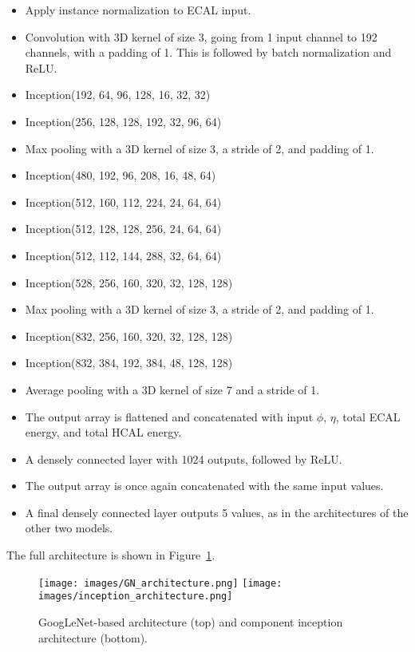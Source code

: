 \begin{itemize}
    \item Apply instance normalization to ECAL input.
    \item Convolution with 3D kernel of size 3, going from 1 input channel to 192 channels, with a padding of 1. This is followed by batch normalization and ReLU.
    \item Inception(192,  64,  96, 128, 16, 32, 32)
    \item Inception(256, 128, 128, 192, 32, 96, 64)
    \item Max pooling with a 3D kernel of size 3, a stride of 2, and padding of 1.
    \item Inception(480, 192,  96, 208, 16,  48,  64)
    \item Inception(512, 160, 112, 224, 24,  64,  64)
    \item Inception(512, 128, 128, 256, 24,  64,  64)
    \item Inception(512, 112, 144, 288, 32,  64,  64)
    \item Inception(528, 256, 160, 320, 32, 128, 128)
    \item Max pooling with a 3D kernel of size 3, a stride of 2, and padding of 1.
    \item Inception(832, 256, 160, 320, 32, 128, 128)
    \item Inception(832, 384, 192, 384, 48, 128, 128)
    \item Average pooling with a 3D kernel of size 7 and a stride of 1.
    \item The output array is flattened and concatenated with input $\phi$, $\eta$, total ECAL energy, and total HCAL energy.
    \item A densely connected layer with 1024 outputs, followed by ReLU.
    \item The output array is once again concatenated with the same input values.
    \item A final densely connected layer outputs 5 values, as in the architectures of the other two models.
\end{itemize}

The full architecture is shown in Figure~\ref{fig:gn_with_inceptin}.

\begin{figure}[htbp]
\centering
\texttt{[image: images/GN\_architecture.png]}
\texttt{[image: images/inception\_architecture.png]}
\caption{GoogLeNet-based architecture (top) and component inception architecture (bottom).
}
\label{fig:gn_with_inceptin}
\end{figure}